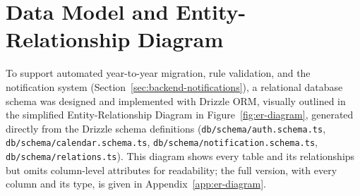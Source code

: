 \section{Data Model and Entity-Relationship Diagram} \label{sec:data-model}

To support automated year-to-year migration, rule validation, and the notification system (Section~\ref{sec:backend-notifications}), a relational database schema was designed and implemented with Drizzle ORM, visually outlined in the simplified Entity-Relationship Diagram in Figure~\ref{fig:er-diagram}, generated directly from the Drizzle schema definitions (\texttt{db/schema/auth.schema.ts}, \texttt{db/schema/calendar.schema.ts}, \texttt{db/schema/notification.schema.ts}, \texttt{db/schema/relations.ts}). This diagram shows every table and its relationships but omits column-level attributes for readability; the full version, with every column and its type, is given in Appendix~\ref{app:er-diagram}.

